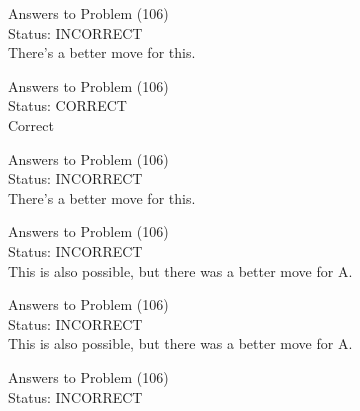 \documentclass[11pt]{article}
\begin{document}
\begin{minipage}[t]{0.5\textwidth}
  {\centering
  
  Answers to Problem (106)\\
  Status: INCORRECT\\
  There's a better move for this.\\
  }
\end{minipage}
\begin{minipage}[t]{0.5\textwidth}
  {\centering
  
  Answers to Problem (106)\\
  Status: CORRECT\\
  Correct\\
  }
\end{minipage}
\begin{minipage}[t]{0.5\textwidth}
  {\centering
  
  Answers to Problem (106)\\
  Status: INCORRECT\\
  There's a better move for this.\\
  }
\end{minipage}
\begin{minipage}[t]{0.5\textwidth}
  {\centering
  
  Answers to Problem (106)\\
  Status: INCORRECT\\
  This is also possible, but there was a better move for A.\\
  }
\end{minipage}
\begin{minipage}[t]{0.5\textwidth}
  {\centering
  
  Answers to Problem (106)\\
  Status: INCORRECT\\
  This is also possible, but there was a better move for A.\\
  }
\end{minipage}
\begin{minipage}[t]{0.5\textwidth}
  {\centering
  
  Answers to Problem (106)\\
  Status: INCORRECT\\
  
  }
\end{minipage}
\end{document}
